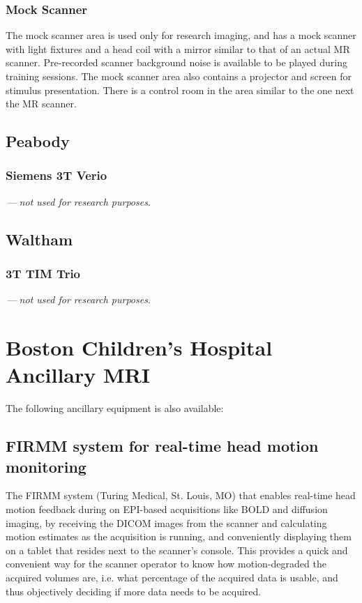 \documentclass[11pt]{amsart}
\begin{document}
\hypertarget{x-mock-scanner}{\subsubsection*{Mock Scanner}}
The mock scanner area is used only for research imaging, and has a mock scanner with light fixtures and a head coil with a mirror similar to that of an actual MR scanner. Pre-recorded scanner background noise is available to be played during training sessions. The mock scanner area also contains a projector and screen for stimulus presentation. There is a control room in the area similar to the one next the MR scanner.


\hypertarget{x-peabody}{\subsection*{Peabody}}
\hypertarget{x-siemens-3t-verio}{\subsubsection*{Siemens 3T Verio}}
 — \emph{not used for research purposes}.


\hypertarget{x-waltham}{\subsection*{Waltham}}
\hypertarget{x-3t-tim-trio}{\subsubsection*{3T TIM Trio}}
 — \emph{not used for research purposes}.


\hypertarget{x-boston-children’s-hospital-ancillary-mri}{\section*{Boston Children’s Hospital Ancillary MRI}}
The following ancillary equipment is also available:


\hypertarget{x-firmm-system-for-real-time-head-motion-monitoring}{\subsection*{FIRMM system for real-time head motion monitoring}}
The FIRMM system (Turing Medical, St. Louis, MO) that enables real-time head motion feedback during on EPI-based acquisitions like BOLD and diffusion imaging, by receiving the DICOM images from the scanner and calculating motion estimates as the acquisition is running, and conveniently displaying them on a tablet that resides next to the scanner’s console. This provides a quick and convenient way for the scanner operator to know how motion-degraded the acquired volumes are, i.e. what percentage of the acquired data is usable, and thus objectively deciding if more data needs to be acquired.
\end{document}
